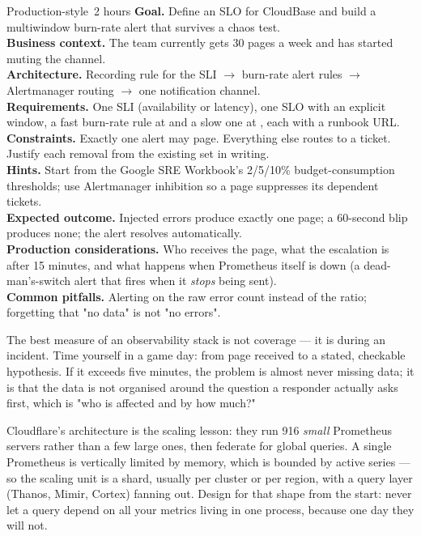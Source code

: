 \begin{minilab}{Production-style}{~2 hours}
\textbf{Goal.} Define an SLO for CloudBase and build a multiwindow burn-rate alert that survives a chaos test.\\
\textbf{Business context.} The team currently gets 30 pages a week and has started muting the channel.\\
\textbf{Architecture.} Recording rule for the SLI $\rightarrow$ burn-rate alert rules $\rightarrow$ Alertmanager routing $\rightarrow$ one notification channel.\\
\textbf{Requirements.} One SLI (availability or latency), one SLO with an explicit window, a fast burn-rate rule at  and a slow one at , each with a runbook URL.\\
\textbf{Constraints.} Exactly one alert may page. Everything else routes to a ticket. Justify each removal from the existing set in writing.\\
\textbf{Hints.} Start from the Google SRE Workbook's 2/5/10\% budget-consumption thresholds; use Alertmanager inhibition so a page suppresses its dependent tickets.\\
\textbf{Expected outcome.} Injected errors produce exactly one page; a 60-second blip produces none; the alert resolves automatically.\\
\textbf{Production considerations.} Who receives the page, what the escalation is after 15 minutes, and what happens when Prometheus itself is down (a dead-man's-switch alert that fires when it \emph{stops} being sent).\\
\textbf{Common pitfalls.} Alerting on the raw error count instead of the ratio; forgetting that "no data" is not "no errors".
\end{minilab}


\begin{opsnote}
The best measure of an observability stack is not coverage --- it is  during an incident. Time yourself in a game day: from page received to a stated, checkable hypothesis. If it exceeds five minutes, the problem is almost never missing data; it is that the data is not organised around the question a responder actually asks first, which is "who is affected and by how much?"
\end{opsnote}

\begin{scalenote}
Cloudflare's architecture is the scaling lesson: they run 916 \emph{small} Prometheus servers rather than a few large ones, then federate for global queries. A single Prometheus is vertically limited by memory, which is bounded by active series --- so the scaling unit is a shard, usually per cluster or per region, with a query layer (Thanos, Mimir, Cortex) fanning out. Design for that shape from the start: never let a query depend on all your metrics living in one process, because one day they will not.
\end{scalenote}

